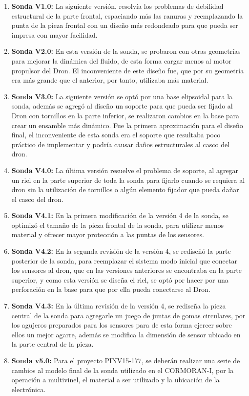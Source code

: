 \begin{appendices}
\begin{enumerate}
\item \textbf{Sonda V1.0:} La siguiente versión, resolvía los problemas de debilidad estructural de la parte frontal, espaciando más las ranuras y reemplazando la punta de la pieza frontal con un diseño más redondeado para que pueda ser impresa con mayor facilidad.   
\item \textbf{Sonda V2.0:} En esta versión de la sonda, se probaron con otras geometrías para mejorar la dinámica del fluido, de esta forma cargar menos al motor propulsor del Dron. El inconveniente de este diseño fue, que por su geometría era más grande que el anterior, por tanto, utilizaba más material.
\item \textbf{Sonda V3.0:} La siguiente versión se optó por una base elipsoidal para la sonda, además se agregó al diseño un soporte para que pueda ser fijado al Dron con tornillos en la parte inferior, se realizaron cambios en la base para crear un ensamble más dinámico. Fue la primera aproximación para el diseño final, el inconveniente de esta sonda era el soporte que resultaba poco práctico de implementar y podría causar daños estructurales al casco del dron.
\item \textbf{Sonda V4.0:} La última versión resuelve el problema de soporte, al agregar un riel en la parte superior de toda la sonda para fijarlo cuando se requiera al dron sin la utilización de tornillos o algún elemento fijador que pueda dañar el casco del dron.
\item \textbf{Sonda V4.1:} En la primera modificación de la versión 4 de la sonda, se optimizó el tamaño de la pieza frontal de la sonda,  para utilizar menos material y ofrecer mayor protección a las puntas de los sensores.
\item \textbf{Sonda V4.2:} En la segunda revisión de la versión 4, se rediseñó la parte posterior de la sonda, para reemplazar el sistema modo inicial que conectar los sensores al dron, que en las versiones anteriores se encontraba en la parte superior, y como esta versión se diseña el riel, se optó por hacer por una perforación en la base para que por ella pueda conectarse al Dron.
\item \textbf{Sonda V4.3:} En la última revisión de la versión 4, se rediseña la pieza central de la sonda para agregarle un juego de juntas de gomas circulares, por los agujeros preparados para los sensores para de esta forma ejercer sobre ellos un mejor agarre, además se modifica la dimensión de sensor ubicado en la parte central de la pieza.
\item \textbf{Sonda v5.0:} Para el proyecto PINV15-177, se deberán realizar una serie de cambios al modelo final de la sonda utilizado en el CORMORAN-I, por la operación a multivinel, el material a ser utilizado y la ubicación de la electrónica.
\end{enumerate}



\end{appendices}
